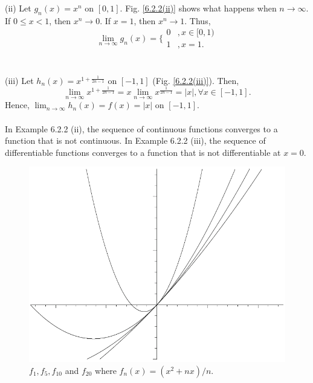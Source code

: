 \documentclass{article}
\begin{document}
           (ii) Let $g_n(x) = x^n$ on $[0,1]$. Fig. \ref{6.2.2(ii)} shows what happens when $n \to \infty$. If $0 \leq x < 1$, then $x^n \to 0$. If $x=1$, then $x^n \to 1$. Thus,
           \begin{equation*}
               \lim_{n \to \infty} g_n(x) = \bigg\{ \begin{matrix} 0 &, x \in [0,1) \\
               1 &, x=1. \end{matrix}
           \end{equation*}
           \\ \\
           (iii) Let $h_n(x) = x^{1 + \frac{1}{2n-1}}$ on $[-1,1]$ (Fig. \ref{6.2.2(iii)}). Then,
           \begin{equation*}
               \lim_{n \to \infty} x^{1 + \frac{1}{2n-1}} = x \lim_{n \to \infty} x^{\frac{1}{2n-1}} = |x|, \forall x \in [-1,1].
           \end{equation*}
           Hence, $\lim_{n \to \infty} h_n(x) = f(x)=|x|$ on $[-1,1]$.
           \\ \\
           In Example 6.2.2 (ii), the sequence of continuous functions converges to a function that is not continuous. In Example 6.2.2 (iii), the sequence of differentiable functions converges to a function that is not differentiable at $x=0$.
           
           \begin{figure}[ht!]
               \centering
               \includegraphics[width=0.6\linewidth]{figs/exp6.2.2(i).png}
               \caption{$f_1,f_5,f_{10}$ and $f_{20}$ where $f_n(x) = (x^2+nx)/n$.}
               \label{6.2.2(i)}
           \end{figure}
           
\end{document}
